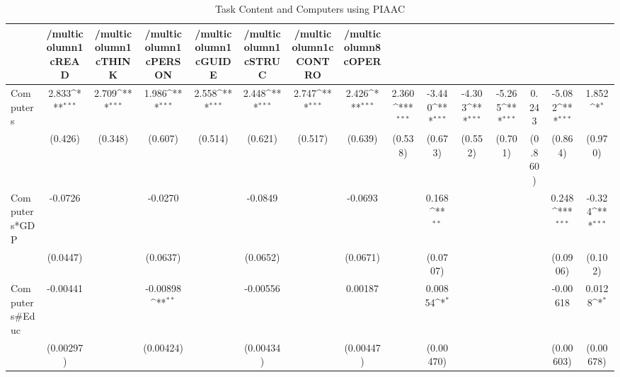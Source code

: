 \begin{table}[htbp]\centering
\def\sym#1{\ifmmode^{#1}\else\(^{#1}\)\fi}
\caption{Task Content and Computers using PIAAC}
\begin{tabular}{l*{14}{c}}
\hline\hline
            &/multicolumn{1}{c}{READ}&/multicolumn{1}{c}{THINK}&/multicolumn{1}{c}{PERSON}&/multicolumn{1}{c}{GUIDE}&/multicolumn{1}{c}{STRUC}&/multicolumn{1}{c}{CONTRO}&/multicolumn{8}{c}{OPER}                                                                                                                                                       \\
\hline
Computers   &       2.833\sym{***}&       2.709\sym{***}&       1.986\sym{***}&       2.558\sym{***}&       2.448\sym{***}&       2.747\sym{***}&       2.426\sym{***}&       2.360\sym{***}&      -3.440\sym{***}&      -4.303\sym{***}&      -5.265\sym{***}&       0.243         &      -5.082\sym{***}&       1.852\sym{*}  \\
            &     (0.426)         &     (0.348)         &     (0.607)         &     (0.514)         &     (0.621)         &     (0.517)         &     (0.639)         &     (0.538)         &     (0.673)         &     (0.552)         &     (0.701)         &     (0.860)         &     (0.864)         &     (0.970)         \\
[1em]
Computers*GDP&     -0.0726         &                     &     -0.0270         &                     &     -0.0849         &                     &     -0.0693         &                     &       0.168\sym{**} &                     &                     &                     &       0.248\sym{***}&      -0.324\sym{***}\\
            &    (0.0447)         &                     &    (0.0637)         &                     &    (0.0652)         &                     &    (0.0671)         &                     &    (0.0707)         &                     &                     &                     &    (0.0906)         &     (0.102)         \\
[1em]
Computers#Educ&    -0.00441         &                     &    -0.00898\sym{**} &                     &    -0.00556         &                     &     0.00187         &                     &     0.00854\sym{*}  &                     &                     &                     &    -0.00618         &      0.0128\sym{*}  \\
            &   (0.00297)         &                     &   (0.00424)         &                     &   (0.00434)         &                     &   (0.00447)         &                     &   (0.00470)         &                     &                     &                     &   (0.00603)         &   (0.00678)         \\

\end{tabular}
\end{table}
